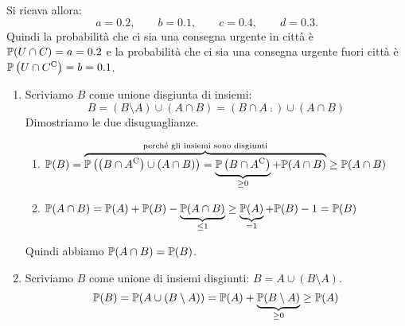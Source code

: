 Si ricava allora:
\begin{equation*}
	a=0.2,\qquad b=0.1,\qquad c=0.4,\qquad d=0.3.
\end{equation*}
Quindi la probabilità che ci sia una consegna urgente in città è $\mathbb{P}(U\cap C) =a=0.2$ e la probabilità che ci sia una consegna urgente fuori città è $\mathbb{P}\left(U\cap C^{\mathrm{C}}\right) =b=0.1$.

\Soluzione

\begin{enumerate}
	\item Scriviamo $B$ come unione disgiunta di insiemi:
	\[
		B=(B\setminus A) \cup (A\cap B) =\left(B\cap A\comp\right) \cup (A\cap B)
	\]
	Dimostriamo le due disuguaglianze.
	\begin{enumerate}
		\item $\mathbb{P}(B) =\overbrace{\mathbb{P}\left(\left(B\cap A^{\mathrm{C}}\right) \cup (A\cap B)\right) =\underbrace{\mathbb{P}\left(B\cap A^{\mathrm{C}}\right)}_{\geq 0} +\mathbb{P}(A\cap B)}^{\text{perché gli insiemi sono disgiunti}} \geq \mathbb{P}(A\cap B)$
		\item $\mathbb{P}(A\cap B) =\mathbb{P}(A) +\mathbb{P}(B) -\underbrace{\mathbb{P}(A\cap B)}_{\leq 1} \geq \underbrace{\mathbb{P}(A)}_{=1} +\mathbb{P}(B) -1=\mathbb{P}(B)$
	\end{enumerate}
	Quindi abbiamo $\mathbb{P}(A\cap B) =\mathbb{P}(B)$.
	\item Scriviamo $B$ come unione di insiemi disgiunti: $B=A\cup (B\setminus A)$.
	\[
		\mathbb{P}(B) =\mathbb{P}(A\cup ( B\setminus A)) =\mathbb{P}(A) +\underbrace{\mathbb{P}(B\setminus A)}_{\geq 0} \geq \mathbb{P}(A)
	\]
\end{enumerate}

\Soluzione

